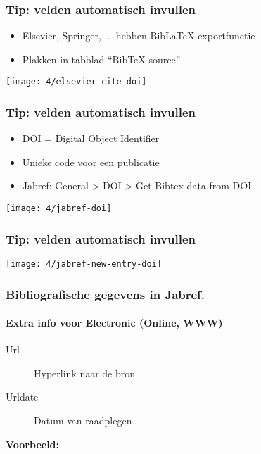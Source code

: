 \documentclass[aspectratio=169]{beamer}
\begin{document}
\begin{frame}
  \frametitle{Tip: velden automatisch invullen}

  \begin{itemize}
    \item Elsevier, Springer, \ldots\ hebben Bib\LaTeX{} exportfunctie
    \item Plakken in tabblad ``BibTeX source''
  \end{itemize}

  \bigskip

  \centering
  \texttt{[image: 4/elsevier-cite-doi]}

\end{frame}

\begin{frame}
  \frametitle{Tip: velden automatisch invullen}

  \begin{itemize}
    \item DOI = Digital Object Identifier
    \item Unieke code voor een publicatie
    \item Jabref: General > DOI > Get Bibtex data from DOI
  \end{itemize}

  \bigskip

  \centering
  \texttt{[image: 4/jabref-doi]}

\end{frame}

\begin{frame}[plain]
  \frametitle{Tip: velden automatisch invullen}

  \centering
  \texttt{[image: 4/jabref-new-entry-doi]}

\end{frame}

\begin{frame}[plain]
  \frametitle{Bibliografische gegevens in Jabref.}
  \framesubtitle{Extra info voor Electronic (Online, WWW)}

  \begin{description}
    \item[Url] Hyperlink naar de bron
    \item[Urldate] Datum van raadplegen
  \end{description}

  \bigskip

  \textbf{Voorbeeld:}

  \bigskip


\end{frame}
\end{document}

